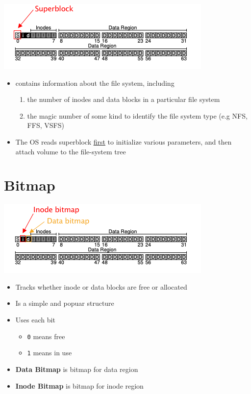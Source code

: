\documentclass[12pt]{article}
\begin{document}
\begin{center}
\includegraphics[width=\linewidth]{images/midterm_1_solution_9.png}
\end{center}

\begin{itemize}
    \item contains information about the file system, including

    \begin{enumerate}[1.]
        \item the number of inodes and data blocks in a particular file system
        \item the magic number of some kind to identify the file system type (e.g NFS, FFS, VSFS)
    \end{enumerate}

    \item The OS reads superblock \underline{first} to initialize various parameters,
    and then attach volume to the file-system tree
\end{itemize}

\section*{Bitmap}

\begin{center}
\includegraphics[width=\linewidth]{images/midterm_1_solution_10.png}
\end{center}

\begin{itemize}
    \item Tracks whether inode or data blocks are free or allocated
    \item Is a simple and popuar structure
    \item Uses each bit
    \begin{itemize}
        \item \texttt{0} means free
        \item \texttt{1} means in use
    \end{itemize}

    \item \textbf{Data Bitmap} is bitmap for data region
    \item \textbf{Inode Bitmap} is bitmap for inode region
\end{itemize}
\end{document}
